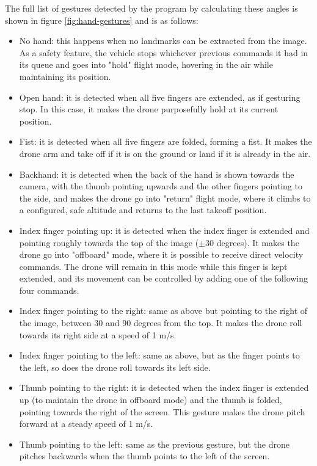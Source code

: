 The full list of gestures detected by the program by calculating these angles is shown in figure \ref{fig:hand-gestures} and is as follows:
\begin{itemize}
    \item No hand: this happens when no landmarks can be extracted from the image. As a safety feature, the vehicle stops whichever previous commands it had in its queue and goes into "hold" flight mode, hovering in the air while maintaining its position.
    \item Open hand: it is detected when all five fingers are extended, as if gesturing stop. In this case, it makes the drone purposefully hold at its current position.
    \item Fist: it is detected when all five fingers are folded, forming a fist. It makes the drone arm and take off if it is on the ground or land if it is already in the air.
    \item Backhand: it is detected when the back of the hand is shown towards the camera, with the thumb pointing upwards and the other fingers pointing to the side, and makes the drone go into "return" flight mode, where it climbs to a configured, safe altitude and returns to the last takeoff position.
    \item Index finger pointing up: it is detected when the index finger is extended and pointing roughly towards the top of the image ($\pm 30$ degrees). It makes the drone go into "offboard" mode, where it is possible to receive direct velocity commands. The drone will remain in this mode while this finger is kept extended, and its movement can be controlled by adding one of the following four commands.
    \item Index finger pointing to the right: same as above but pointing to the right of the image, between 30 and 90 degrees from the top. It makes the drone roll towards its right side at a speed of 1 m/s.
    \item Index finger pointing to the left: same as above, but as the finger points to the left, so does the drone roll towards its left side.
    \item Thumb pointing to the right: it is detected when the index finger is extended up (to maintain the drone in offboard mode) and the thumb is folded, pointing towards the right of the screen. This gesture makes the drone pitch forward at a steady speed of 1 m/s.
    \item Thumb pointing to the left: same as the previous gesture, but the drone pitches backwards when the thumb points to the left of the screen.
\end{itemize}

